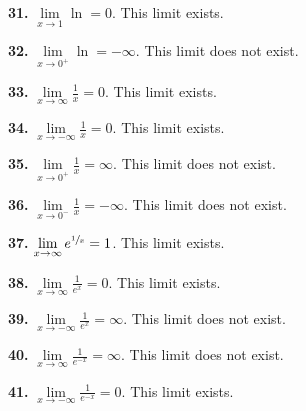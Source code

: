 \documentclass[12pt,]{book}
\theoremstyle{plain}
\theoremstyle{definition}
\numberwithin{equation}{section}
\newcommand{\fe}[2]{\mathop{{#1}{\left(#2\right)}}}
\begin{document}
                \par\smallskip
\noindent\textbf{31.}\quad{}
                    \(\lim\limits_{x\to1}\fe{\ln}{x}=0\). This limit exists.%

                \par\smallskip
\noindent\textbf{32.}\quad{}
                    \(\lim\limits_{x\to0^{+}}\fe{\ln}{x}=-\infty\). This limit does not exist.%

                \par\smallskip
\noindent\textbf{33.}\quad{}
                    \(\lim\limits_{x\to\infty}\frac{1}{x}=0\). This limit exists.%

                \par\smallskip
\noindent\textbf{34.}\quad{}
                    \(\lim\limits_{x\to-\infty}\frac{1}{x}=0\). This limit exists.%

                \par\smallskip
\noindent\textbf{35.}\quad{}
                    \(\lim\limits_{x\to0^{+}}\frac{1}{x}=\infty\). This limit does not exist.%

                \par\smallskip
\noindent\textbf{36.}\quad{}
                    \(\lim\limits_{x\to0^{-}}\frac{1}{x}=-\infty\). This limit does not exist.%

                \par\smallskip
\noindent\textbf{37.}\quad{}
                    \(\lim\limits_{x\to\infty}e^{\sfrac{1}{x}}=1\). This limit exists.%

                \par\smallskip
\noindent\textbf{38.}\quad{}
                    \(\lim\limits_{x\to\infty}\frac{1}{e^x}=0\). This limit exists.%

                \par\smallskip
\noindent\textbf{39.}\quad{}
                    \(\lim\limits_{x\to-\infty}\frac{1}{e^x}=\infty\). This limit does not exist.%

                \par\smallskip
\noindent\textbf{40.}\quad{}
                    \(\lim\limits_{x\to\infty}\frac{1}{e^{-x}}=\infty\). This limit does not exist.%

                \par\smallskip
\noindent\textbf{41.}\quad{}
                    \(\lim\limits_{x\to-\infty}\frac{1}{e^{-x}}=0\). This limit exists.%

                \par\smallskip
\end{document}
